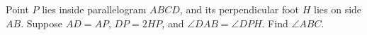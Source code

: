 Point $ P $ lies inside parallelogram $ ABCD $, and its perpendicular foot $ H $ lies on side $ AB $. Suppose $ AD=AP $, $ DP=2HP $, and $\angle DAB=\angle DPH $. Find $\angle ABC $.
